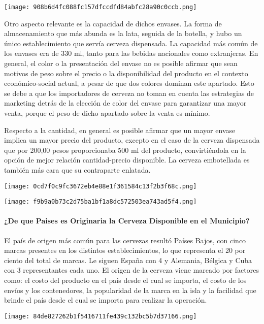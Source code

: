 \texttt{[image: 908b6d4fc088fc157dfccdfd84abfc28a90c0ccb.png]}

Otro aspecto relevante es la capacidad de dichos envases. La forma de
almacenamiento que más abunda es la lata, seguida de la botella, y hubo
un único establecimiento que servía cerveza dispensada. La capacidad más
común de los envases era de 330 ml, tanto para las bebidas nacionales
como extranjeras. En general, el color o la presentación del envase no
es posible afirmar que sean motivos de peso sobre el precio o la
disponibilidad del producto en el contexto económico-social actual, a
pesar de que dos colores dominan este apartado. Esto se debe a que los
importadores de cerveza no toman en cuenta las estrategias de marketing
detrás de la elección de color del envase para garantizar una mayor
venta, porque el peso de dicho apartado sobre la venta es mínimo.

Respecto a la cantidad, en general es posible afirmar que un mayor
envase implica un mayor precio del producto, excepto en el caso de la
cerveza dispensada que por 200,00 pesos proporcionaba 500 ml del
producto, convirtiéndola en la opción de mejor relación cantidad-precio
disponible. La cerveza embotellada es también más cara que su
contraparte enlatada.

\texttt{[image: 0cd7f0c9fc3672eb4e88e1f361584c13f2b3f68c.png]}


\texttt{[image: f9b9a0b73c2d75ba1bf1a8dc572503ea743ad5f4.png]}

\hypertarget{de-que-paises-es-originaria-la-cerveza-disponible-en-el-municipio}{%
\paragraph{¿De que Paises es Originaria la Cerveza Disponible en el
Municipio?}\label{de-que-paises-es-originaria-la-cerveza-disponible-en-el-municipio}}

El país de origen más común para las cervezas resultó Países Bajos, con
cinco marcas presentes en los distintos establecimientos, lo que
representa el 20 por ciento del total de marcas. Le siguen España con 4
y Alemania, Bélgica y Cuba con 3 representantes cada uno. El origen de
la cerveza viene marcado por factores como: el costo del producto en el
país desde el cual se importa, el costo de los envíos y los
contenedores, la popularidad de la marca en la isla y la facilidad que
brinde el país desde el cual se importa para realizar la operación.


\texttt{[image: 84de827262b1f5416711fe439c132bc5b7d37166.png]}

